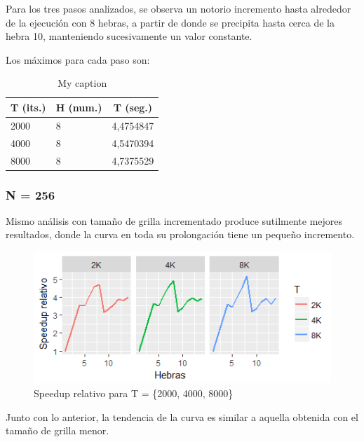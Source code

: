 \documentclass[jou]{apa6}
\begin{document}
Para los tres pasos analizados, se observa un notorio incremento hasta alrededor de la ejecución con 8 hebras, a partir de donde se precipita hasta cerca de la hebra 10, manteniendo sucesivamente un valor constante.

Los máximos para cada paso son:

\begin{table}[]
\centering
\caption{My caption}
\label{my-label}
\begin{tabular}{@{}lll@{}}
\toprule
\multicolumn{1}{c}{T (its.)} & \multicolumn{1}{c}{H (num.)} & \multicolumn{1}{c}{T (seg.)} \\ \midrule
2000                         & 8                            & 4,4754847                    \\
4000                         & 8                            & 4,5470394                    \\
8000                         & 8                            & 4,7375529                    \\ \bottomrule
\end{tabular}
\end{table}

\subsubsection{N = 256}
Mismo análisis con tamaño de grilla incrementado produce sutilmente mejores resultados, donde la curva en toda su prolongación tiene un pequeño incremento.

\begin{figure}[h]
	\includegraphics[width=\columnwidth]{srel-256px.png}
	\caption{Speedup relativo para T = \{2000, 4000, 8000\}}
	\label{fig:Figure4}
\end{figure}

Junto con lo anterior, la tendencia de la curva es similar a aquella obtenida con el tamaño de grilla menor.
\end{document}
